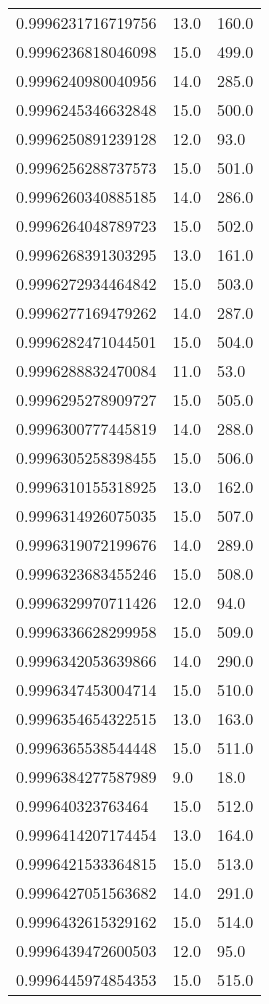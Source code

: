 \begin{center}
\begin{supertabular}[H]{p{0.30\textwidth}p{0.05\textwidth}p{0.05\textwidth}}
0.9996231716719756 & 13.0 & 160.0 \\ 
0.9996236818046098 & 15.0 & 499.0 \\ 
0.9996240980040956 & 14.0 & 285.0 \\ 
0.9996245346632848 & 15.0 & 500.0 \\ 
0.9996250891239128 & 12.0 & 93.0 \\ 
0.9996256288737573 & 15.0 & 501.0 \\ 
0.9996260340885185 & 14.0 & 286.0 \\ 
0.9996264048789723 & 15.0 & 502.0 \\ 
0.9996268391303295 & 13.0 & 161.0 \\ 
0.9996272934464842 & 15.0 & 503.0 \\ 
0.9996277169479262 & 14.0 & 287.0 \\ 
0.9996282471044501 & 15.0 & 504.0 \\ 
0.9996288832470084 & 11.0 & 53.0 \\ 
0.9996295278909727 & 15.0 & 505.0 \\ 
0.9996300777445819 & 14.0 & 288.0 \\ 
0.9996305258398455 & 15.0 & 506.0 \\ 
0.9996310155318925 & 13.0 & 162.0 \\ 
0.9996314926075035 & 15.0 & 507.0 \\ 
0.9996319072199676 & 14.0 & 289.0 \\ 
0.9996323683455246 & 15.0 & 508.0 \\ 
0.9996329970711426 & 12.0 & 94.0 \\ 
0.9996336628299958 & 15.0 & 509.0 \\ 
0.9996342053639866 & 14.0 & 290.0 \\ 
0.9996347453004714 & 15.0 & 510.0 \\ 
0.9996354654322515 & 13.0 & 163.0 \\ 
0.9996365538544448 & 15.0 & 511.0 \\ 
0.9996384277587989 & 9.0 & 18.0 \\ 
0.999640323763464 & 15.0 & 512.0 \\ 
0.9996414207174454 & 13.0 & 164.0 \\ 
0.9996421533364815 & 15.0 & 513.0 \\ 
0.9996427051563682 & 14.0 & 291.0 \\ 
0.9996432615329162 & 15.0 & 514.0 \\ 
0.9996439472600503 & 12.0 & 95.0 \\ 
0.9996445974854353 & 15.0 & 515.0 \\ 

\end{supertabular}
\end{center}
